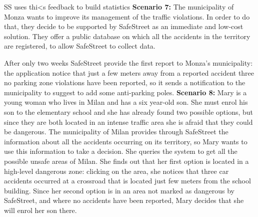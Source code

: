 \documentclass[../RASD.tex]{subfiles}
\begin{document}
                SS uses thi<s feedback to build statistics
    \newline
    \newline
                \textbf{Scenario 7:} The municipality of Monza wants to improve its management of the traffic violations. In order to do that, they decide to be supported by SafeStreet as an immediate and low-cost solution. They offer a public database on which all the accidents in the territory are registered, to allow SafeStreet to collect data.

                After only two weeks SafeStreet provide the first report to Monza’s municipality: the application notice that just a few meters away from a reported accident three no parking zone violations have been reported, so it sends a notification to the municipality to suggest to add some anti-parking poles.
    \newline
    \newline
                \textbf{Scenario 8:} Mary is a young woman who lives in Milan and has a six year-old son. She must enrol his son to the elementary school and she has already found two possible options, but since they are both located in an intense traffic area she is afraid that they could be dangerous. The municipality of Milan provides through SafeStreet the information about all the accidents occurring on its territory, so Mary wants to use this information to take a decision. She queries the system to get all the possible unsafe areas of Milan. She finds out that her first option is located in a high-level dangerous zone: clicking on the area, she notices that three car accidents occurred at a crossroad that is located just few meters from the school building. Since her second option is in an area not marked as dangerous by SafeStreet, and where no accidents have been reported, Mary decides that she will enrol her son there.
\end{document}
